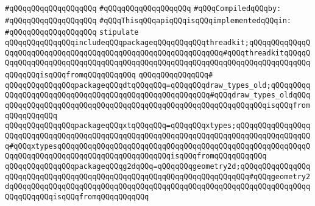 \verb|#qQQqqQQqqQQqqQQqqQQq|\newline
\verb|#qQQqqQQqqQQqqQQqqQQq|\newline
\newline
\verb|#qQQqCompiledqQQqby:|\newline
\verb|#qQQqqQQqqQQqqQQqqQQq|\newline
\newline
\verb|#qQQqThisqQQqapiqQQqisqQQqimplementedqQQqin:|\newline
\verb|#qQQqqQQqqQQqqQQqqQQq|\newline
\newline
\verb|stipulate|\newline
\verb|qQQqqQQqqQQqqQQqincludeqQQqpackageqQQqqQQqqQQqthreadkit;qQQqqQQqqQQqqQQqqQQqqQQqqQQqqQQqqQQqqQQqqQQqqQQqqQQqqQQqqQQqqQQq#qQQqthreadkitqQQqqQQqqQQqqQQqqQQqqQQqqQQqqQQqqQQqqQQqqQQqqQQqqQQqqQQqqQQqqQQqqQQqqQQqqQQqqQQqqQQqisqQQqfromqQQqqQQqqQQq|\newline
\verb|qQQqqQQqqQQqqQQq#|\newline
\verb|qQQqqQQqqQQqqQQqpackageqQQqdtqQQqqQQq=qQQqqQQqdraw_types_old;qQQqqQQqqQQqqQQqqQQqqQQqqQQqqQQqqQQqqQQqqQQqqQQqqQQqqQQq#qQQqdraw_types_oldqQQqqQQqqQQqqQQqqQQqqQQqqQQqqQQqqQQqqQQqqQQqqQQqqQQqqQQqqQQqqQQqisqQQqfromqQQqqQQqqQQq|\newline
\verb|qQQqqQQqqQQqqQQqpackageqQQqxtqQQqqQQq=qQQqqQQqxtypes;qQQqqQQqqQQqqQQqqQQqqQQqqQQqqQQqqQQqqQQqqQQqqQQqqQQqqQQqqQQqqQQqqQQqqQQqqQQqqQQqqQQqqQQq#qQQqxtypesqQQqqQQqqQQqqQQqqQQqqQQqqQQqqQQqqQQqqQQqqQQqqQQqqQQqqQQqqQQqqQQqqQQqqQQqqQQqqQQqqQQqqQQqqQQqqQQqisqQQqfromqQQqqQQqqQQq|\newline
\verb|qQQqqQQqqQQqqQQqpackageqQQqg2dqQQq=qQQqqQQqgeometry2d;qQQqqQQqqQQqqQQqqQQqqQQqqQQqqQQqqQQqqQQqqQQqqQQqqQQqqQQqqQQqqQQqqQQqqQQq#qQQqgeometry2dqQQqqQQqqQQqqQQqqQQqqQQqqQQqqQQqqQQqqQQqqQQqqQQqqQQqqQQqqQQqqQQqqQQqqQQqqQQqqQQqisqQQqfromqQQqqQQqqQQq|\newline
